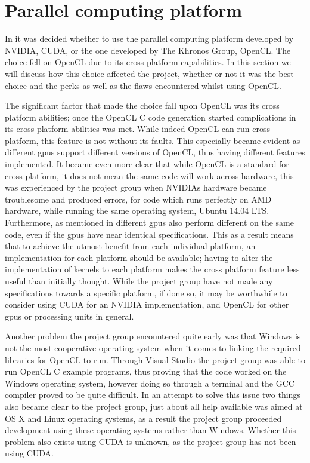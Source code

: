 \section{Parallel computing platform}
In  it was decided whether to use the parallel computing platform developed by NVIDIA, CUDA, or the one developed by The Khronos Group, OpenCL.
The choice fell on OpenCL due to its cross platform capabilities.
In this section we will discuss how this choice affected the project, whether or not it was the best choice and the perks as well as the flaws encountered whilst using OpenCL.

The significant factor that made the choice fall upon OpenCL was its cross platform abilities; once the OpenCL C code generation started complications in its cross platform abilities was met.
While indeed OpenCL can run cross platform, this feature is not without its faults.
This especially became evident as different \acrshort{gpu}s support different versions of OpenCL, thus having different features implemented.
It became even more clear that while OpenCL is a standard for cross platform, it does not mean the same code will work across hardware, this was experienced by the project group when NVIDIAs hardware became troublesome and produced errors, for code which runs perfectly on AMD hardware, while running the same operating system, Ubuntu 14.04 LTS.
Furthermore, as mentioned in  different \acrshort{gpu}s also perform different on the same code, even if the \acrshort{gpu}s have near identical specifications.
This as a result means that to achieve the utmost benefit from each individual platform, an implementation for each platform should be available; having to alter the implementation of kernels to each platform makes the cross platform feature less useful than initially thought.
While the project group have not made any specifications towards a specific platform, if done so, it may be worthwhile to consider using CUDA for an NVIDIA implementation, and OpenCL for other \acrshort{gpu}s or processing units in general.

Another problem the project group encountered quite early was that Windows is not the most cooperative operating system when it comes to linking the required libraries for OpenCL to run.
Through Visual Studio the project group was able to run OpenCL C example programs, thus proving that the code worked on the Windows operating system, however doing so through a terminal and the GCC compiler proved to be quite difficult. 
In an attempt to solve this issue two things also became clear to the project group, just about all help available was aimed at OS X and Linux operating systems, as a result the project group proceeded development using these operating systems rather than Windows.
Whether this problem also exists using CUDA is unknown, as the project group has not been using CUDA. 

